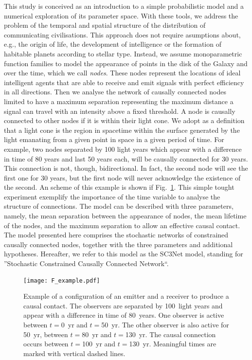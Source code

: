 \documentclass[crop]{CSLB}
\begin{document}
This study is conceived as an introduction to a simple probabilistic
model and a numerical exploration of its parameter space.
%
With these tools, we address the problem of the temporal and spatial
structure of the distribution of communicating civilisations.
%
This approach does not require asumptions about, e.g., the origin of
life, the development of intelligence or the formation of habitable
planets according to stellar type.
%
Instead, we assume monoparametric function families to model the
appearance of points in the disk of the Galaxy and over the time,
which we call \textit{nodes}.
%
These nodes represent the locations of ideal intelligent agents that
are able to receive and emit signals with perfect efficiency in all
directions.
%
Then we analyse the network of causally connected nodes limited to
have a maximum separation representing the maximum distance a signal
can travel with an intensity above a fixed threshold.
%
A node is causally connected to other nodes if it is within their
light cone.
%
We adopt as a definition that a light cone is the region in spacetime
within the surface generated by the light emanating from a given point
in space in a given period of time.
%
For example, two nodes separated by 100 light years which appear with
a difference in time of 80 years and last 50 years each, will be
causally connected for 30 years.
%
This connection is not, though, bidirectional.
%
In fact, the second node will see the first one for 30 years, but the
first node will never acknowledge the existence of the second.
%
An scheme of this example is shown if Fig.~\ref{F_example}.
%
This simple tought experiment exemplify the importance of the time
variable to analyse the structure of connections.
%
The model can be described with three parameters, namely, the mean
separation between the appearance of nodes, the mean lifetime of the
nodes, and the maximum separation to allow an effective causal
contact.
%
The model presented here comprises the stochastic networks of
constrained causally connected nodes, together with the three
parameters and additional hypotheses.
%
Hereafter, we refer to this model as the SC3Net model, standing for
''Stochastic Constrained Causally Connected Network``.


\begin{figure}[h]
%
\centering
%
\texttt{[image: F\_example.pdf]}
%
\caption{Example of a configuration of an emitter and a receiver 
   to produce a causal contact.
   The observers are separated by 100~light years and appear with a
   difference in time of 80~years. One observer is active between
   $t=$0~yr and $t=$50~yr.  The other observer is also active for
   50~yr, between $t=$80~yr and $t=$130~yr. 
   The causal connection occurs between $t=$100~yr and $t=$130~yr.
   Meaningful times are marked with vertical dashed lines.
   }
%
\label{F_example}
%
\end{figure}
\end{document}
